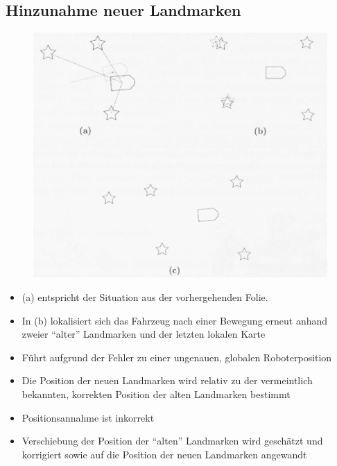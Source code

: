 \subsection{Hinzunahme neuer Landmarken}
\begin{figure}[H]
	\begin{center}
		\includegraphics[scale=0.5]{Resources/PNG/LandmarkenErweitern.PNG}
		\caption{}
		\label{fig:PNG/LandmarkenErweitern.PNG}
	\end{center}
\end{figure}
\begin{itemize}
	\item (a) entspricht der Situation aus der vorhergehenden Folie.
	\item In (b) lokalisiert sich das Fahrzeug nach einer Bewegung erneut anhand zweier \enquote{alter} Landmarken und der letzten lokalen Karte
	\item Führt aufgrund der Fehler zu einer ungenauen, globalen Roboterposition
	\item Die Position der neuen Landmarken wird relativ zu der vermeintlich bekannten, korrekten Position der alten Landmarken bestimmt
	\item Positionsannahme ist inkorrekt
	\item Verschiebung der Position der \enquote{alten} Landmarken wird geschätzt und korrigiert sowie auf die Position der neuen Landmarken angewandt
\end{itemize}
